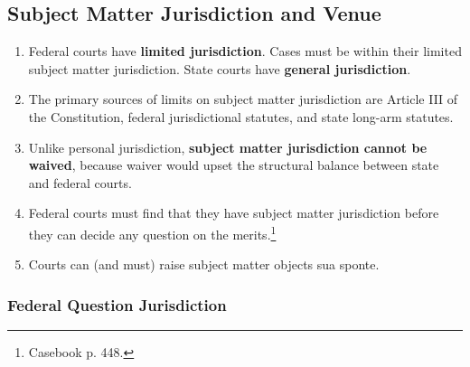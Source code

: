 \subsection{Subject Matter Jurisdiction and Venue}

\begin{enumerate}
    \item Federal courts have \textbf{limited jurisdiction}. Cases must be 
    within their limited subject matter jurisdiction. State courts have 
    \textbf{general jurisdiction}.
    \item The primary sources of limits on subject matter jurisdiction are 
    Article III of the Constitution, federal jurisdictional statutes, and 
    state long-arm statutes.
    \item Unlike personal jurisdiction, \textbf{subject matter jurisdiction 
    cannot be waived}, because waiver would upset the structural balance 
    between state and federal courts.
    \item Federal courts must find that they have subject matter jurisdiction 
    before they can decide any question on the merits.\footnote{Casebook p.  
    448.}
    \item Courts can (and must) raise subject matter objects sua sponte.
\end{enumerate}

\subsubsection{Federal Question Jurisdiction}


